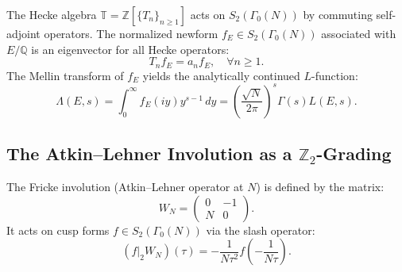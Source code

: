 \documentclass[11pt,reqno]{article}
\theoremstyle{plain}
\theoremstyle{definition}
\begin{document}
The Hecke algebra $\mathbb{T} = \mathbb{Z}[ \{T_n\}_{n \ge 1} ]$ acts on $S_2(\Gamma_0(N))$ by commuting self-adjoint operators. The normalized newform $f_E \in S_2(\Gamma_0(N))$ associated with $E/\mathbb{Q}$ is an eigenvector for all Hecke operators:
\begin{equation}
    T_n f_E = a_n f_E, \quad \forall n \ge 1.
\end{equation}
The Mellin transform of $f_E$ yields the analytically continued $L$-function:
\begin{equation}
    \label{eq:mellin_transform}
    \Lambda(E, s) = \int_0^\infty f_E(iy) y^{s-1} \, dy = \left( \frac{\sqrt{N}}{2\pi} \right)^s \Gamma(s) L(E, s).
\end{equation}

\subsection{The Atkin--Lehner Involution as a $\mathbb{Z}_2$-Grading}

The Fricke involution (Atkin--Lehner operator at $N$) is defined by the matrix:
\begin{equation}
    W_N = \begin{pmatrix} 0 & -1 \\ N & 0 \end{pmatrix}.
\end{equation}
It acts on cusp forms $f \in S_2(\Gamma_0(N))$ via the slash operator:
\begin{equation}
    (f |_2 W_N)(\tau) = - \frac{1}{N \tau^2} f\left( -\frac{1}{N\tau} \right).
\end{equation}
\end{document}
